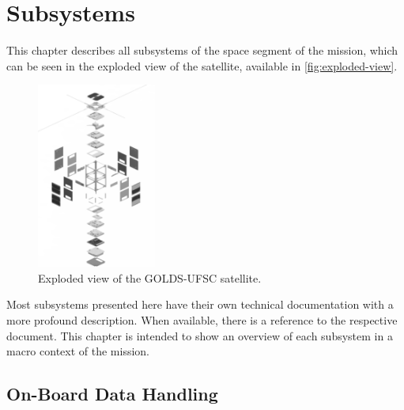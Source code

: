 %
%
%
%
%

%
%
%
%
%
%

\chapter{Subsystems} \label{ch:subsystems}

This chapter describes all subsystems of the space segment of the mission, which can be seen in the exploded view of the satellite, available in \autoref{fig:exploded-view}.

\begin{figure}[!htb]
    \begin{center}
        \includegraphics[width=0.35\textwidth]{figures/floripasat.png}
        \caption{Exploded view of the GOLDS-UFSC satellite.}
        \label{fig:exploded-view}
    \end{center}
\end{figure}

Most subsystems presented here have their own technical documentation with a more profound description. When available, there is a reference to the respective document. This chapter is intended to show an overview of each subsystem in a macro context of the mission.

\section{On-Board Data Handling}

